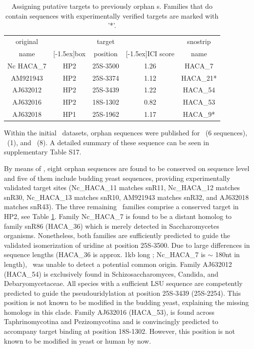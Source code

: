 \begin{table}
  \caption[Potential targets for orphan \haca s.]{Assigning putative targets to previously
    orphan \haca s. Families that do contain sequences with
    experimentally verified targets are marked with '*'. }
  \label{tab:orphan_hacas_short}
  \begin{center}
    \begin{footnotesize}
      \begin{tabular}{c|c|c|c|c}
        original&&target&&snostrip\\
        name&\raisebox{1.5ex}[-1.5ex]{box}&position&\raisebox{1.5ex}[-1.5ex]{ICI
            score}&name\\
        \hline
        Nc HACA\_7&HP2&25S-3500&1.26&HACA\_7\\
        AM921943&HP2&25S-3374&1.12&HACA\_21*\\
        AJ632012&HP2&25S-3439&1.22&HACA\_54\\
        AJ632016&HP2&18S-1302&0.82&HACA\_53\\
        AJ632018&HP1&25S-1962&1.17&HACA\_9*\\
      \end{tabular}
    \end{footnotesize}
  \end{center}
\end{table}

Within the initial \haca\ datasets, orphan sequences were published
for \ncr\ (6 sequences), \afu\ (1), and \spo\ (8).  A detailed summary
of these sequence can be seen in supplementary Table S17.

By means of \snostrip, eight orphan sequences are found to be
conserved on sequence level and five of them include budding yeast
sequences, providing experimentally validated target sites
(Nc\_HACA\_11 matches snR11, Nc\_HACA\_12 matches snR30, Nc\_HACA\_13
matches snR10, AM921943 matches snR32, and AJ632018 matches
snR43). The three remaining \sno\ families comprise a conserved target
in HP2, see Table \ref{tab:orphan_hacas_short}. Family Nc\_HACA\_7 is
found to be a distant homolog to family snR86 (HACA\_36) which is
merely detected in Saccharomycetes organisms. Nonetheless, both
families are sufficiently predicted to guide the validated
isomerization of uridine at position 25S-3500. Due to large
differences in sequence lengths (HACA\_36 is approx. 1kb long ;
Nc\_HACA\_7 is $\sim$ 180nt in length), \snostrip\ was unable to
detect a potential common origin. Family AJ632012 (HACA\_54) is
exclusively found in Schizosaccharomyces, Candida, and
Debaryomycetaceae. All species with a sufficient LSU sequence are
competently predicted to guide the pseudouridylation at position
25S-3439 (\sce 25S-2254). This position is not known to be modified in
the budding yeast, explaining the missing homologs in this
clade. Family AJ632016 (HACA\_53), is found across Taphrinomycotina
and Pezizomycotina and is convincingly predicted to accompany target
binding at position 18S-1302. However, this position is not known to
be modified in yeast or human by now.

